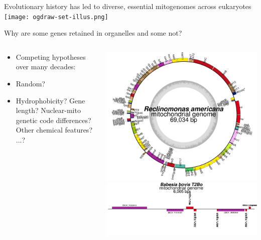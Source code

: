 \documentclass[10pt]{beamer}
\begin{document}
\begin{frame}{Evolutionary history has led to diverse, essential mitogenomes across eukaryotes}
  \centering
  \texttt{[image: ogdraw-set-illus.png]} \\
\end{frame}


\begin{frame}{Why are some genes retained in organelles and some not?}
  \begin{columns}
    \begin{column}{0.55\textwidth}

      \begin{itemize}
      \item Competing hypotheses over many decades:
      \item Random?
      \item Hydrophobicity? Gene length? Nuclear-mito genetic code differences? Other chemical features? ...?
       \end{itemize}
    \end{column}
    \begin{column}{0.45\textwidth}
      \includegraphics[width=\textwidth]{ogdraw-ra-mt.png} \\
      \hspace{1cm}
      \includegraphics[width=\textwidth]{ogdraw-bb-mt.png} \\
    \end{column}
  \end{columns}

\end{frame}
\end{document}
